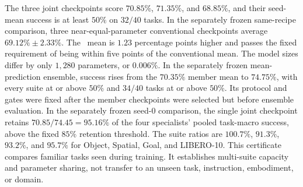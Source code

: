 The three joint checkpoints score $70.85\%$, $71.35\%$, and $68.85\%$, and their
seed-mean success is at least $50\%$ on $32/40$ tasks. In the separately frozen
same-recipe comparison, three near-equal-parameter conventional checkpoints average
$69.12\%\pm2.33\%$. The \chivla\ mean is $1.23$ percentage points higher and passes
the fixed requirement of being within five points of the conventional mean. The model
sizes differ by only $1{,}280$ parameters, or $0.006\%$.
In the separately frozen
mean-prediction ensemble, success rises from the $70.35\%$ member mean to $74.75\%$,
with every suite at or above $50\%$ and $34/40$ tasks at or above $50\%$. Its protocol
and gates were fixed after the member checkpoints were selected but before ensemble
evaluation. In the separately frozen
seed-$0$ comparison, the single joint checkpoint retains
$70.85/74.45=95.16\%$ of the four specialists' pooled task-macro success, above the
fixed $85\%$ retention threshold. The suite ratios are $100.7\%$, $91.3\%$,
$93.2\%$, and $95.7\%$ for Object, Spatial, Goal, and LIBERO-10. This certificate
compares familiar tasks seen during training. It establishes multi-suite capacity and
parameter sharing, not transfer to an unseen task, instruction, embodiment, or domain.
